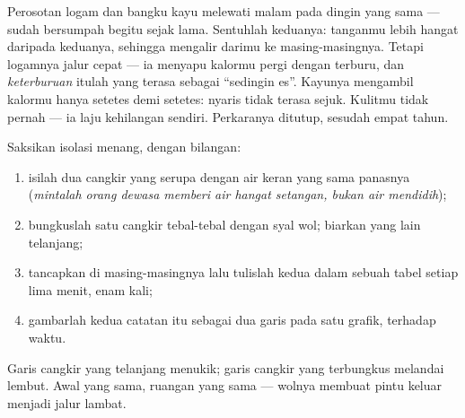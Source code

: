 \begin{example}\label{ex:g5:heat-and-insulation:slide}
Perosotan logam dan bangku kayu melewati malam pada  dingin yang
sama ---  sudah bersumpah begitu sejak lama. Sentuhlah
keduanya: tanganmu lebih hangat daripada keduanya, sehingga 
mengalir darimu ke masing-masingnya. Tetapi logamnya jalur cepat ---
ia menyapu kalormu pergi dengan terburu, dan \emph{keterburuan} itulah
yang terasa sebagai ``sedingin es''. Kayunya mengambil kalormu hanya
setetes demi setetes: nyaris tidak terasa sejuk. Kulitmu tidak pernah
  --- ia  laju kehilangan  sendiri.
Perkaranya ditutup, sesudah empat tahun.
\end{example}

\begin{method}\label{met:g5:heat-and-insulation:race}
Saksikan isolasi menang, dengan bilangan:
\begin{enumerate}
  \item isilah dua cangkir yang serupa dengan air keran yang sama
        panasnya (\emph{mintalah orang dewasa memberi air hangat
        setangan, bukan air mendidih});
  \item bungkuslah satu cangkir tebal-tebal dengan syal wol; biarkan
        yang lain telanjang;
  \item tancapkan  di masing-masingnya lalu tulislah kedua
         dalam sebuah tabel setiap lima menit, enam kali;
  \item gambarlah kedua catatan itu sebagai dua garis pada satu
        grafik,  terhadap waktu.
\end{enumerate}
Garis cangkir yang telanjang menukik; garis cangkir yang terbungkus
melandai lembut. Awal yang sama, ruangan yang sama --- wolnya membuat
pintu keluar  menjadi jalur lambat.
\end{method}

